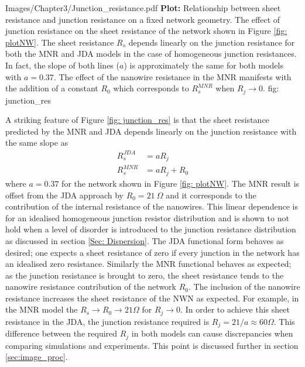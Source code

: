 {Images/Chapter3/Junction_resistance.pdf}
{\textbf{Plot:} Relationship between sheet resistance and junction resistance on a fixed network geometry.}
{The effect of junction resistance on the sheet resistance of the network shown in Figure \ref{fig: plotNW}. The sheet resistance $R_s$ depends linearly on the junction resistance for both the MNR and JDA models in the case of homogeneous junction resistances. In fact, the slope of both lines ($a$) is approximately the same for both models with $a = 0.37$. The effect of the nanowire resistance in the MNR manifests with the addition of a constant $R_0$ which corresponds to $R_s^{MNR}$ when $R_j \rightarrow 0$.\cite{rocha2015}}
{fig: junction_res}

A striking feature of Figure \ref{fig: junction_res} is that the sheet resistance predicted by the MNR and JDA depends linearly on the junction resistance with the same slope as
\begin{align}
R_s^{JDA} &= a R_j  \label{eq: Rs_jda}\\
R_s^{MNR} &= a R_j + R_0 \label{eq: Rs_mnr}
\end{align}
where $a = 0.37$ for the network shown in Figure \ref{fig: plotNW}. The MNR result is offset from the JDA approach by $R_0 = 21 ~ \Omega$ and it corresponds to the contribution of the internal resistance of the nanowires. This linear dependence is for an idealised homogeneous junction resistor distribution and is shown to not hold when a level of disorder is introduced to the junction resistance distribution as discussed in section \ref{Sec: Dispersion}. The JDA functional form behaves as desired; one expects a sheet resistance of zero if every junction in the network has an idealised zero resistance. Similarly the MNR functional behaves as expected; as the junction resistance is brought to zero, the sheet resistance tends to the nanowire resistance contribution of the network $R_0$. The inclusion of the nanowire resistance increases the sheet resistance of the NWN as expected. For example, in the MNR model the $R_s \rightarrow R_0 \rightarrow 21\Omega$ for $R_j \rightarrow 0$. In order to achieve this sheet resistance in the JDA, the junction resistance required is $R_j = 21/a \approx 60 \Omega$. This difference between the required $R_j$ in both models can cause discrepancies when comparing simulations and experiments. This point is discussed further in section \ref{sec:image_proc}.

